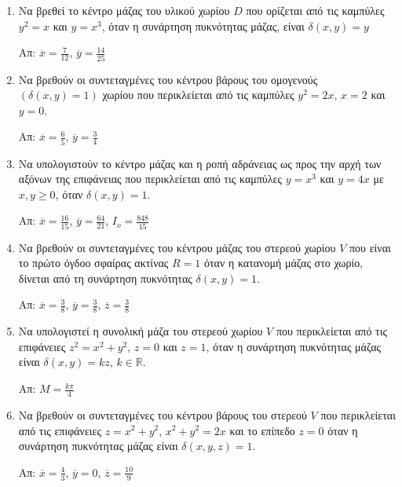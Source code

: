 



\thispagestyle{empty}




\begin{center}
\end{center}

\vspace{\baselineskip}

\begin{enumerate}
  \item Να βρεθεί το κέντρο μάζας του υλικού χωρίου $D$ που ορίζεται από τις καμπύλες $y^{2}=x$ και $y=x^{3}$, όταν η συνάρτηση πυκνότητας μάζας, είναι $\delta(x,y)=y$

  \hfill Απ: $\overline{x}=\frac{7}{12}$, $\overline{y}=\frac{14}{25}$

  \item Να βρεθούν οι συντεταγμένες του κέντρου βάρους του ομογενούς $(\delta(x,y)=1)$ χωρίου που περικλείεται από τις καμπύλες $y^{2}=2x$, $x=2$ και $y=0$.

  \hfill Απ: $\overline{x}=\frac{6}{5}$, $\overline{y}=\frac{3}{4}$

  \item  Να υπολογιστούν το κέντρο μάζας και η ροπή αδράνειας ως προς την αρχή των αξόνων της επιφάνειας που περικλείεται από τις καμπύλες $y=x^{3}$ και  $y=4x$ με $x,y\geq 0$, όταν $\delta(x,y)=1$.

  \hfill Απ: $\overline{x}=\frac{16}{15}$, $\overline{y}=\frac{64}{21}$, $I_{o}=\frac{848}{15}$

  \item Να βρεθούν οι συντεταγμένες του κέντρου μάζας του στερεού χωρίου $V$ που είναι το πρώτο όγδοο σφαίρας ακτίνας $R=1$ όταν η κατανομή μάζας στο χωρίο, δίνεται από τη συνάρτηση πυκνότητας $\delta(x,y)=1$.

  \hfill Απ: $\overline{x}=\frac{3}{8}$, $\overline{y}=\frac{3}{8}$, $\overline{z}=\frac{3}{8}$

  \item Να υπολογιστεί η συνολική μάζα του στερεού χωρίου $V$ που περικλείεται από τις επιφάνειες $z^{2}=x^{2}+y^{2}$, $z=0$ και $z=1$, όταν η συνάρτηση πυκνότητας μάζας είναι $\delta(x,y)=kz$, $k\in\mathbb{R}$.

  \hfill Απ: $M=\frac{k\pi}{4}$

  \item Να βρεθούν οι συντεταγμένες του κέντρου βάρους του στερεού $V$ που περικλείεται από τις επιφάνειες $z=x^{2}+y^{2}$, $x^{2}+y^{2}=2x$ και το επίπεδο $z=0$ όταν η συνάρτηση πυκνότητας μάζας είναι $\delta(x,y,z)=1$.

  \hfill Απ: $\overline{x}=\frac{4}{3}$, $\overline{y}=0$, $\overline{z}=\frac{10}{9}$

\end{enumerate}



